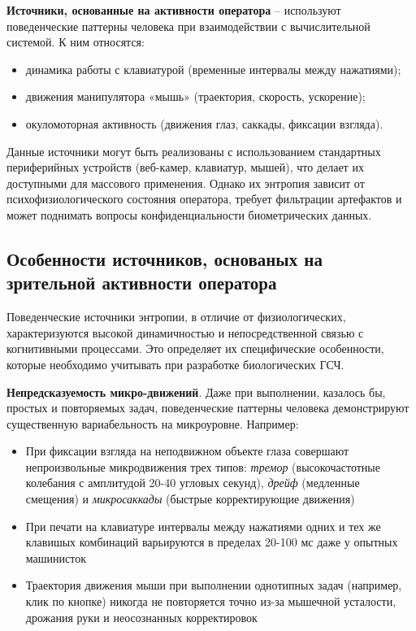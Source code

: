 \documentclass[14pt, a4paper]{extreport}
\begin{document}
\textbf{Источники, основанные на активности оператора} -- используют поведенческие паттерны человека при взаимодействии с вычислительной системой. К ним относятся:
\begin{itemize}
    \item динамика работы с клавиатурой (временные интервалы между нажатиями);
    \item движения манипулятора «мышь» (траектория, скорость, ускорение);
    \item окуломоторная активность (движения глаз, саккады, фиксации взгляда).
\end{itemize}
Данные источники могут быть реализованы с использованием стандартных периферийных устройств (веб-камер, клавиатур, мышей), что делает их доступными для массового применения. Однако их энтропия зависит от психофизиологического состояния оператора, требует фильтрации артефактов и может поднимать вопросы конфиденциальности биометрических данных.

\subsection{Особенности источников, основаных на зрительной активности оператора}

Поведенческие источники энтропии, в отличие от физиологических, характеризуются высокой динамичностью и непосредственной связью с когнитивными процессами. Это определяет их специфические особенности, которые необходимо учитывать при разработке биологических ГСЧ.

\textbf{Непредсказуемость микро-движений}. Даже при выполнении, казалось бы, простых и повторяемых задач, поведенческие паттерны человека демонстрируют существенную вариабельность на микроуровне. Например:
\begin{itemize}
    \item При фиксации взгляда на неподвижном объекте глаза совершают непроизвольные микродвижения трех типов: \textit{тремор} (высокочастотные колебания с амплитудой 20-40 угловых секунд), \textit{дрейф} (медленные смещения) и \textit{микросаккады} (быстрые корректирующие движения)
    \item При печати на клавиатуре интервалы между нажатиями одних и тех же клавишых комбинаций варьируются в пределах 20-100 мс даже у опытных машинисток
    \item Траектория движения мыши при выполнении однотипных задач (например, клик по кнопке) никогда не повторяется точно из-за мышечной усталости, дрожания руки и неосознанных корректировок
\end{itemize}
\end{document}

